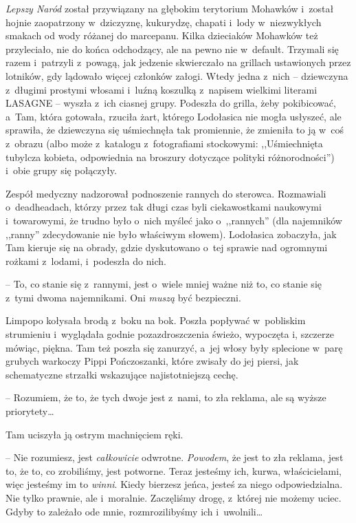 \documentclass[oneside,polish,11pt,sfheadings]{mwbk}
\begin{document}
\textit{Lepszy Naród} został przywiązany na głębokim terytorium Mohawków i~został hojnie zaopatrzony w~dziczyznę, kukurydzę, chapati i~lody w~niezwykłych smakach od wody różanej do marcepanu. Kilka dzieciaków
Mohawków też przyleciało, nie do końca odchodzący, ale na pewno nie w~default. Trzymali się razem i~patrzyli z~powagą, jak jedzenie
skwierczało na grillach ustawionych przez lotników, gdy lądowało więcej
członków załogi. Wtedy jedna z~nich -- dziewczyna z~długimi prostymi
włosami i~luźną koszulką z~napisem wielkimi literami LASAGNE -- wyszła z~ich ciasnej grupy. Podeszła do grilla, żeby pokibicować, a~Tam, która
gotowała, rzuciła żart, którego Lodołasica nie mogła usłyszeć, ale
sprawiła, że dziewczyna się uśmiechnęła tak promiennie, że zmieniła to
ją w~coś z~obrazu (albo może z~katalogu z~fotografiami stockowymi:
,,Uśmiechnięta tubylcza kobieta, odpowiednia na broszury dotyczące
polityki różnorodności'') i~obie grupy się połączyły.

Zespół medyczny nadzorował podnoszenie rannych do sterowca. Rozmawiali o~deadheadach, którzy przez tak długi czas byli ciekawostkami naukowymi i~towarowymi, że trudno było o~nich myśleć jako o~,,rannych'' (dla
najemników ,,ranny'' zdecydowanie nie było właściwym słowem). Lodołasica
zobaczyła, jak Tam kieruje się na obrady, gdzie dyskutowano o~tej
sprawie nad ogromnymi rożkami z~lodami, i~podeszła do nich.

-- To, co stanie się z~rannymi, jest o~wiele mniej ważne niż to, co
stanie się z~tymi dwoma najemnikami. Oni \textit{muszą} być bezpieczni.

Limpopo kołysała brodą z~boku na bok. Poszła popływać w~pobliskim
strumieniu i~wyglądała godnie pozazdroszczenia świeżo, wypoczęta i,
szczerze mówiąc, piękna. Tam też poszła się zanurzyć, a~jej włosy były
splecione w~parę grubych warkoczy Pippi Pończoszanki, które zwisały do
jej piersi, jak schematyczne strzałki wskazujące najistotniejszą cechę.

-- Rozumiem, że to, że tych dwoje jest z~nami, to zła reklama, ale są
wyższe priorytety\ldots 

Tam uciszyła ją ostrym machnięciem ręki. 

-- Nie rozumiesz, jest
\textit{całkowicie} odwrotne. \textit{Powodem}, że jest to zła reklama,
jest to, że to, co zrobiliśmy, jest potworne. Teraz jesteśmy ich, kurwa,
właścicielami, więc jesteśmy im to \textit{winni}. Kiedy bierzesz jeńca,
jesteś za niego odpowiedzialna. Nie tylko prawnie, ale i~moralnie.
Zaczęliśmy drogę, z~której nie możemy uciec. Gdyby to zależało ode mnie,
rozmrozilibyśmy ich i~uwolnili\ldots 
\end{document}
